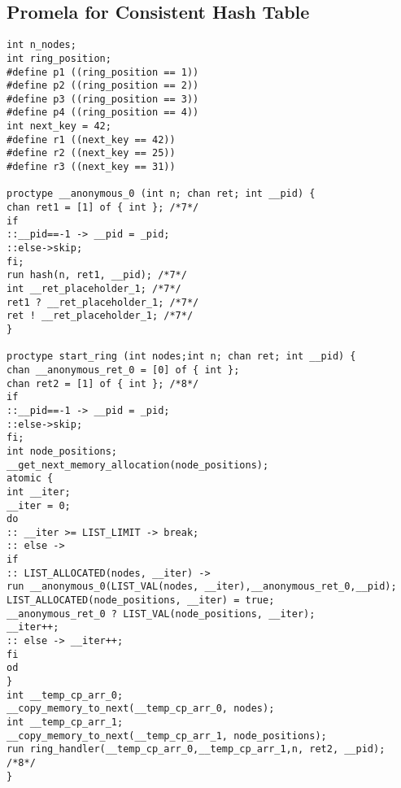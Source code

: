\subsection{Promela for Consistent Hash Table}
\begin{lstlisting}[xleftmargin=.01\linewidth, xrightmargin=0.01\linewidth, caption={Promela of consistent hash table}, label={lst:dht_promela}]
int n_nodes;
int ring_position;
#define p1 ((ring_position == 1))
#define p2 ((ring_position == 2))
#define p3 ((ring_position == 3))
#define p4 ((ring_position == 4))
int next_key = 42;
#define r1 ((next_key == 42))
#define r2 ((next_key == 25))
#define r3 ((next_key == 31))

proctype __anonymous_0 (int n; chan ret; int __pid) {
chan ret1 = [1] of { int }; /*7*/
if
::__pid==-1 -> __pid = _pid;
::else->skip;
fi;
run hash(n, ret1, __pid); /*7*/
int __ret_placeholder_1; /*7*/
ret1 ? __ret_placeholder_1; /*7*/
ret ! __ret_placeholder_1; /*7*/
}

proctype start_ring (int nodes;int n; chan ret; int __pid) {
chan __anonymous_ret_0 = [0] of { int };
chan ret2 = [1] of { int }; /*8*/
if
::__pid==-1 -> __pid = _pid;
::else->skip;
fi;
int node_positions;
__get_next_memory_allocation(node_positions);
atomic {
int __iter;
__iter = 0;
do
:: __iter >= LIST_LIMIT -> break;
:: else ->
if
:: LIST_ALLOCATED(nodes, __iter) ->
run __anonymous_0(LIST_VAL(nodes, __iter),__anonymous_ret_0,__pid);
LIST_ALLOCATED(node_positions, __iter) = true;
__anonymous_ret_0 ? LIST_VAL(node_positions, __iter);
__iter++;
:: else -> __iter++;
fi
od
}
int __temp_cp_arr_0;
__copy_memory_to_next(__temp_cp_arr_0, nodes);
int __temp_cp_arr_1;
__copy_memory_to_next(__temp_cp_arr_1, node_positions);
run ring_handler(__temp_cp_arr_0,__temp_cp_arr_1,n, ret2, __pid); /*8*/
}


\end{lstlisting}
